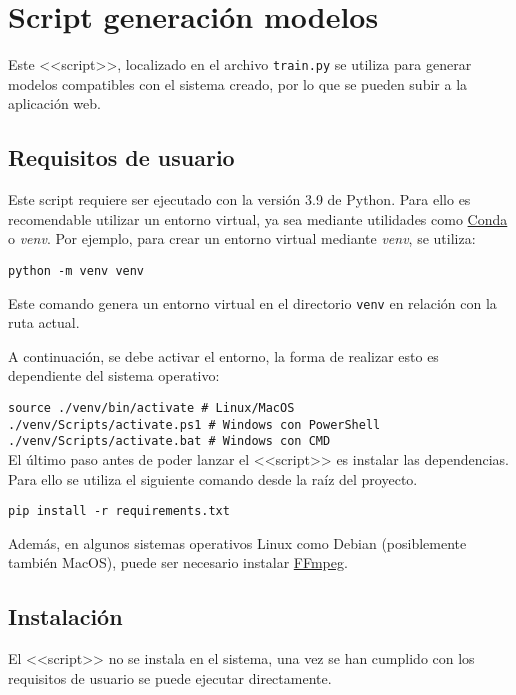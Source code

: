 \section{Script generación modelos}

Este <<script>>, localizado en el archivo \texttt{train.py} se utiliza para
generar modelos compatibles con el sistema creado, por lo que se pueden subir a
la aplicación web.

\subsection{Requisitos de usuario}

Este script requiere ser ejecutado con la versión 3.9 de Python. Para ello es
recomendable utilizar un entorno virtual, ya sea mediante utilidades como
\href{https://docs.conda.io/en/latest/}{Conda} o \textit{venv}. Por
ejemplo, para crear un entorno virtual mediante \textit{venv}, se utiliza:

\texttt{python -m venv venv}

Este comando genera un entorno virtual en el directorio \texttt{venv} en
relación con la ruta actual.

A continuación, se debe activar el entorno, la forma de realizar esto es
dependiente del sistema operativo:

\texttt{source ./venv/bin/activate \# Linux/MacOS} \\

\texttt{./venv/Scripts/activate.ps1 \# Windows con PowerShell} \\

\texttt{./venv/Scripts/activate.bat \# Windows con CMD} \\

El último paso antes de poder lanzar el <<script>> es instalar las dependencias.
Para ello se utiliza el siguiente comando desde la raíz del proyecto.

\texttt{pip install -r requirements.txt}

Además, en algunos sistemas operativos Linux como Debian (posiblemente también
MacOS), puede ser necesario instalar \href{https://ffmpeg.org/}{FFmpeg}.

\subsection{Instalación}

El <<script>> no se instala en el sistema, una vez se han cumplido con los
requisitos de usuario se puede ejecutar directamente.

